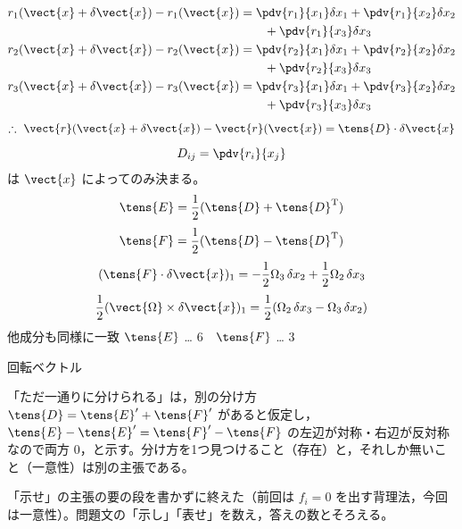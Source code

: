 \begin{align*}
r_{1}(\vect{x}+\delta\vect{x})-r_{1}(\vect{x})&=\pdv{r_{1}}{x_{1}}\delta x_{1}+\pdv{r_{1}}{x_{2}}\delta x_{2}\\
&\qquad+\pdv{r_{1}}{x_{3}}\delta x_{3}\\
r_{2}(\vect{x}+\delta\vect{x})-r_{2}(\vect{x})&=\pdv{r_{2}}{x_{1}}\delta x_{1}+\pdv{r_{2}}{x_{2}}\delta x_{2}\\
&\qquad+\pdv{r_{2}}{x_{3}}\delta x_{3}\\
r_{3}(\vect{x}+\delta\vect{x})-r_{3}(\vect{x})&=\pdv{r_{3}}{x_{1}}\delta x_{1}+\pdv{r_{3}}{x_{2}}\delta x_{2}\\
&\qquad+\pdv{r_{3}}{x_{3}}\delta x_{3}
\end{align*}
\[ \therefore\ \vect{r}(\vect{x}+\delta\vect{x})-\vect{r}(\vect{x})=\tens{D}\cdot\delta\vect{x} \]
\[ D_{ij}=\pdv{r_{i}}{x_{j}} \]
 は $\vect{x}$ によってのみ決まる。
\[ \tens{E}=\frac{1}{2}(\tens{D}+\tens{D}^{\mathrm{T}}) \]
\[ \tens{F}=\frac{1}{2}(\tens{D}-\tens{D}^{\mathrm{T}}) \]
\[ (\tens{F}\cdot\delta\vect{x})_{1}=-\frac{1}{2}\Omega_{3}\,\delta x_{2}+\frac{1}{2}\Omega_{2}\,\delta x_{3} \]
\[ \frac{1}{2}(\vect{\Omega}\times\delta\vect{x})_{1}=\frac{1}{2}(\Omega_{2}\,\delta x_{3}-\Omega_{3}\,\delta x_{2}) \]
他成分も同様に一致
$\tens{E}$ … 6　$\tens{F}$ … 3

回転ベクトル
\item 「ただ一通りに分けられる」は，別の分け方 $\tens{D}=\tens{E}'+\tens{F}'$ があると仮定し，$\tens{E}-\tens{E}'=\tens{F}'-\tens{F}$ の左辺が対称・右辺が反対称なので両方 0，と示す。分け方を1つ見つけること（存在）と，それしか無いこと（一意性）は別の主張である。
\item {} 「示せ」の主張の要の段を書かずに終えた（前回は $f_{i}=0$ を出す背理法，今回は一意性）。問題文の「示し」「表せ」を数え，答えの数とそろえる。
